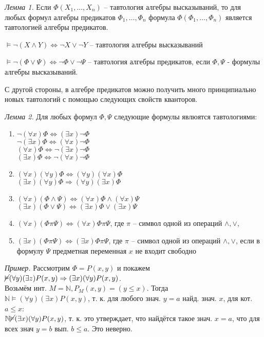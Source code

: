 {\it Лемма 1.} Если $\Phi(X_1, \dots, X_n)$ -- тавтология алгебры высказываний, то для любых формул алгебры предикатов $\Phi_1, \dots, \Phi_n$ формула $\Phi(\Phi_1, \dots, \Phi_n)$ является тавтологией алгебры предикатов.

$\vDash \neg(X\land Y) \Leftrightarrow \neg X \lor \neg Y$ -- тавтология алгебры высказываний

$\vDash \neg(\Phi \lor \Psi) \Leftrightarrow \neg \Phi \lor \neg \Psi$ -- тавтология алгебры предикатов, если $\Phi, \Psi$ - формулы алгебры высказываний.

С другой стороны, в алгебре предикатов можно получить много принципиально новых тавтологий с помощью следующих свойств кванторов.

{\it Лемма 2.} Для любых формул $\Phi, \Psi$ следующие формулы явлюятся тавтологиями:
\begin{enumerate}
    \item $\neg(\forall x)\Phi \Leftrightarrow (\exists x)\neg\Phi$ \\ $\neg(\exists x)\Phi \Leftrightarrow (\forall x)\neg\Phi$ \\
    $(\forall x)\Phi \Leftrightarrow \neg(\exists x)\neg\Phi$ \\ $(\exists x)\Phi \Leftrightarrow \neg(\forall x)\neg\Phi$
    \item $(\forall x)(\forall y)\Phi \Leftrightarrow (\forall y)(\forall x)\Phi$ \\ $(\exists x)(\forall y)\Phi \Rightarrow (\forall y)(\exists x)\Phi$
    \item $(\forall x)(\Phi \land \Psi) \Leftrightarrow (\forall x)\Phi \land (\forall x)\Psi$ \\ $(\exists x)(\Phi \lor \Psi) \Leftrightarrow (\exists x)\Phi \lor (\exists x)\Psi$
    \item $(\forall x)(\Phi \pi \Psi) \Leftrightarrow (\forall x)\Phi \pi \Psi$, где $\pi$ -- символ одной из операций $\land, \lor$,
    \item $(\exists x)(\Phi \pi \Psi) \Leftrightarrow (\exists x)\Phi \pi \Psi$, где $\pi$ -- символ одной из операций $\land, \lor$, если в формулу $\Psi$ предметная переменная $x$ не входит свободно
\end{enumerate}

{\it Пример.} Рассмотрим $\Phi = P(x, y)$ и покажем \\
$\cancel{\vDash} (\forall y)(\exists z)P(x, y) \Rightarrow (\exists x)(\forall y)P(x, y)$. \\
Возьмём инт. $M = \mathbb{N}, P_M(x, y) = (y \leq x)$. Тогда \\
$\mathbb{N} \vDash (\forall y)(\exists x)P(x, y)$, т. к. для любого знач. $y = a$ найд. знач. $x$, для кот. $a \leq x$: \\
$\mathbb{N} \cancel{\vDash} (\exists x)(\forall y)P(x, y)$, т. к. это утверждает, что найдётся такое знач. $x = a$, что для всех знач $y = b$ вып. $b \leq a$. Это неверно.

